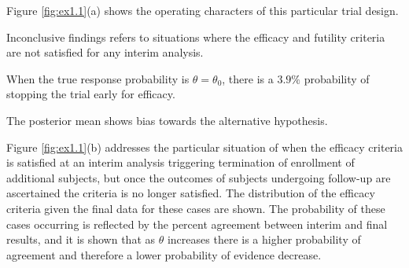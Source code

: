 \documentclass[12pt]{article}
\begin{document}
Figure \ref{fig:ex1.1}(a) shows the operating characters of this particular trial design.

Inconclusive findings refers to situations where the efficacy and futility criteria are not satisfied for any interim analysis.

When the true response probability is $\theta=\theta_0$, there is a $3.9\%$ probability of stopping the trial early for efficacy. 

The posterior mean shows bias towards the alternative hypothesis.

Figure \ref{fig:ex1.1}(b) addresses the particular situation of when the efficacy criteria  is satisfied at an interim analysis triggering termination of enrollment of additional subjects, but once the outcomes of subjects undergoing follow-up are ascertained the criteria is no longer satisfied. The distribution of the efficacy criteria given the final data for these cases are shown. The probability of these cases occurring is reflected by the percent agreement between interim and final results, and it is shown that as $\theta$ increases there is a higher probability of agreement and therefore a lower probability of evidence decrease.
\end{document}
